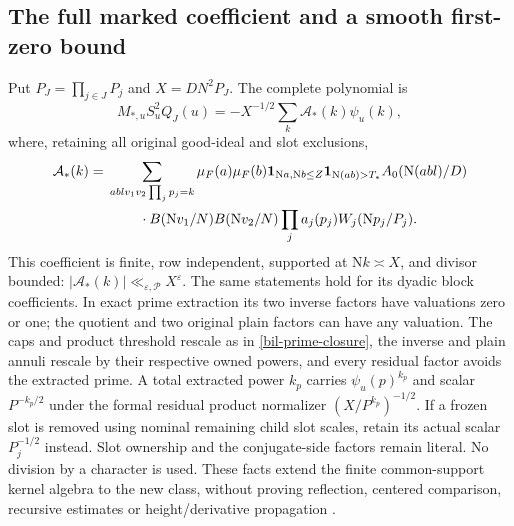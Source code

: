 \documentclass[11pt]{article}
\theoremstyle{definition}
\newcommand{\N}{\mathrm N}
\newcommand{\eps}{\varepsilon}
\newcommand{\Id}{\mathbf 1}
\begin{document}
\subsection{The full marked coefficient and a smooth first-zero bound}
\label{bil-marked-zero}
Put $P_J=\prod_{j\in J}P_j$ and $X=DN^2P_J$. The complete polynomial is
\begin{equation}\label{bil-full-marked-polynomial}
 M_{*,u}S_u^2Q_J(u)=-X^{-1/2}\sum_k\mathcal A_*(k)\psi_u(k),
\end{equation}
where, retaining all original good-ideal and slot exclusions,
\begin{align}\label{bil-full-marked-coefficient}
 \mathcal A_*(k)={}&\sum_{ablv_1v_2\prod_jp_j=k}
 \mu_F(a)\mu_F(b)\Id_{\N a,\N b\le Z}\Id_{\N(ab)>T_*}
 A_0(\N(abl)/D)\notag\\
 &\hspace{8mm}\cdot B(\N v_1/N)B(\N v_2/N)
                \prod_j a_j(p_j)W_j(\N p_j/P_j).
\end{align}
This coefficient is finite, row independent, supported at $\N k\asymp X$,
and divisor bounded: $|\mathcal A_*(k)|\ll_{\eps,\mathcal P}X^\eps$.
The same statements hold for its dyadic block coefficients.
In exact prime extraction its two inverse factors have valuations zero
or one; the quotient and two original plain factors can have any valuation.
The caps and product threshold rescale as in \eqref{bil-prime-closure},
the inverse and plain annuli rescale by their respective owned powers,
and every residual factor avoids the extracted prime. A total extracted
power $k_p$ carries $\psi_u(p)^{k_p}$ and scalar $P^{-k_p/2}$ under
the formal residual product normalizer $(X/P^{k_p})^{-1/2}$.
If a frozen slot is removed using nominal remaining child slot scales,
retain its actual scalar $P_j^{-1/2}$ instead. Slot ownership and
the conjugate-side factors remain literal. No division by a character
is used. These facts extend the finite common-support kernel algebra
to the new class, without proving reflection, centered comparison,
recursive estimates or height/derivative propagation \cite{n24}.
\end{document}
